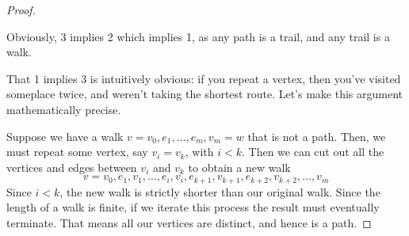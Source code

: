 \documentclass[10pt,]{book}
\theoremstyle{plain}
\theoremstyle{definition}
\theoremstyle{definition}
\theoremstyle{definition}
\newcommand{\lt}{<}
\begin{document}
\begin{proof}\hypertarget{proof-3}{}
\hypertarget{p-94}{}%
Obviously, 3 implies 2 which implies 1, as any path is a trail, and any trail is a walk.%
\par
\hypertarget{p-95}{}%
That 1 implies 3 is intuitively obvious: if you repeat a vertex, then you've visited someplace twice, and weren't taking the shortest route.  Let's make this argument mathematically precise.%
\par
\hypertarget{p-96}{}%
Suppose we have a walk \(v=v_0,e_1,\dots, e_m, v_m=w\) that is not a path.  Then, we must repeat some vertex, say \(v_i=v_k\), with \(i\lt k\).  Then we can cut out all the vertices and edges between \(v_i\) and \(v_k\) to obtain a new walk%
%
\begin{equation*}
v=v_0,e_1, v_1,\dots, e_i, v_i, e_{k+1}, v_{k+1}, e_{k+2}, v_{k+2}, \dots, v_m
\end{equation*}
\hypertarget{p-97}{}%
Since \(i \lt k \), the new walk is strictly shorter than our original walk.  Since the length of a walk is finite, if we iterate this process the result must eventually terminate.  That means all our vertices are distinct, and hence is a path.%
\end{proof}
\end{document}
